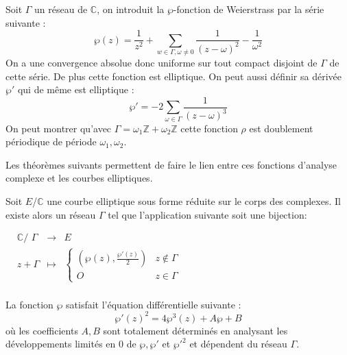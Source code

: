 \documentclass[12pt]{article}
\begin{document}
\begin{defi}
Soit $\Gamma$ un réseau de $\mathbb{C}$, on introduit la $\wp$-fonction de Weierstrass par la série suivante :
\begin{equation*}
\wp(z) = \frac{1}{z^2} + \sum_{w \in \Gamma, \omega \ne 0} \frac{1}{(z-\omega)^2} - \frac{1}{\omega^2}
\end{equation*}
On a une convergence absolue donc uniforme sur tout compact disjoint de $\Gamma$ de cette série. De plus cette fonction est elliptique. On peut aussi définir sa dérivée ${\wp'}$ qui de même est elliptique :
\begin{equation*}
{\wp'} = -2 \sum_{\omega \in \Gamma} \frac{1}{(z-\omega)^3}
\end{equation*}
On peut montrer qu'avec $\Gamma = \omega_1 \mathbb{Z} + \omega_2 \mathbb{Z}$ cette fonction $\rho$ est doublement périodique de période $\omega_1, \omega_2$.
\end{defi}

Les théorèmes suivants permettent de faire le lien entre ces fonctions d'analyse complexe et les courbes elliptiques.

\begin{thm}
Soit $E$/$\mathbb{C}$ une courbe elliptique sous forme réduite sur le corps des complexes. Il existe alors un réseau $\Gamma$ tel que l'application suivante soit une bijection:
\newline
\medskip


$\begin{array}{cccc}
& \mathbb{C}\text{/ }\Gamma & \to & E \\
& z + \Gamma & \mapsto & \left\lbrace
\begin{array}{cc}
 (\wp(z), \frac{{\wp'}(z)}{2})  & z \notin \Gamma \\
 O & z \in \Gamma
\end{array}\right.\\
\end{array}$
\end{thm}

\begin{thm}
La fonction $\wp$ satisfait l'équation différentielle suivante : 
\begin{equation*}
{\wp'}(z)^2 = 4\wp^3(z) + A \wp + B
\end{equation*}
où les coefficients $A,B$ sont totalement déterminés en analysant les développements limités en $0$ de $\wp, {\wp'}$ et ${\wp'}^2$ et dépendent du réseau $\Gamma$.
\end{thm}
\end{document}
